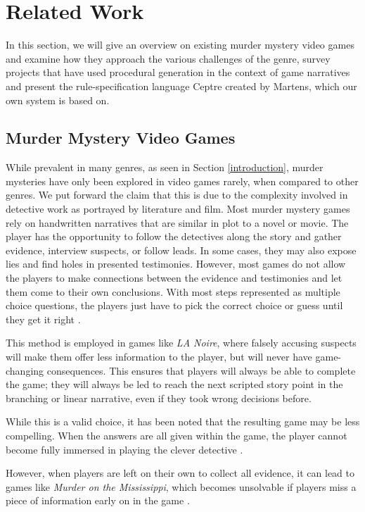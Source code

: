 \section{Related Work} \label{related_work}

In this section, we will give an overview on existing murder mystery video games and examine how they approach the various challenges of the genre, survey projects that have used procedural generation in the context of game narratives and present the rule-specification language Ceptre created by Martens, which our own system is based on.

\subsection{Murder Mystery Video Games}

While prevalent in many genres, as seen in Section \ref{introduction}, murder mysteries have only been explored in video games rarely, when compared to other genres.
We put forward the claim that this is due to the complexity involved in detective work as portrayed by literature and film.
Most murder mystery games rely on handwritten narratives that are similar in plot to a novel or movie.
The player has the opportunity to follow the detectives along the story and gather evidence, interview suspects, or follow leads.
In some cases, they may also expose lies and find holes in presented testimonies.
However, most games do not allow the players to make connections between the evidence and testimonies and let them come to their own conclusions. With most steps represented as multiple choice questions, the players just have to pick the correct choice or guess until they get it right \cite{brown_2017}. 

This method is employed in games like \emph{LA Noire}, where falsely accusing suspects will make them offer less information to the player, but will never have game-changing consequences.
This ensures that players will always be able to complete the game; they will always be led to reach the next scripted story point in the branching or linear narrative, even if they took wrong decisions before.

While this is a valid choice, it has been noted that the resulting game may be less compelling.
When the answers are all given within the game, the player cannot become fully immersed in playing the clever detective \cite{goldstein_2018}.

However, when players are left on their own to collect all evidence, it can lead to games like \emph{Murder on the Mississippi}, which becomes unsolvable if players miss a piece of information early on in the game \cite{petit_2018}.

